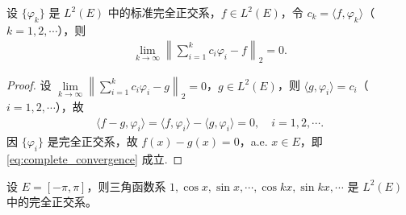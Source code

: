 \documentclass[../../main.tex]{subfiles}%
\begin{document}
\begin{theorem}
设 $\{\varphi_k\}$ 是 $L^2(E)$ 中的标准完全正交系，$f \in L^2(E)$，令 $c_k = \langle f, \varphi_k \rangle$（$k=1,2,\cdots$），则
\begin{align}
\lim_{k \to \infty} \left\| \sum_{i=1}^k c_i \varphi_i - f \right\|_2 = 0. \label{eq:complete_convergence}
\end{align}
\end{theorem}
\begin{proof}
设 $\lim\limits_{k \to \infty} \left\| \sum\limits_{i=1}^k c_i \varphi_i - g \right\|_2 = 0$，$g \in L^2(E)$，则 $\langle g, \varphi_i \rangle = c_i$（$i=1,2,\cdots$），故
\begin{align*}
\langle f - g, \varphi_i \rangle = \langle f, \varphi_i \rangle - \langle g, \varphi_i \rangle = 0, \quad i=1,2,\cdots.
\end{align*}
因 $\{\varphi_i\}$ 是完全正交系，故 $f(x) - g(x) = 0$，a.e. $x \in E$，即 \eqref{eq:complete_convergence} 成立.
\end{proof}

\begin{example}
设 $E = [-\pi, \pi]$，则三角函数系 $1, \cos x, \sin x, \cdots, \cos kx, \sin kx, \cdots$ 是 $L^2(E)$ 中的完全正交系。
\end{example}
\end{document}
